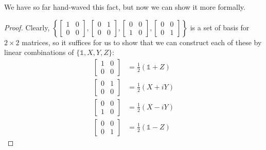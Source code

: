 \documentclass[12pt]{article}
\begin{document}
\begin{lemma}\label{lemma:pauli-is-basis}
We have so far hand-waved this fact, but now we can show it more formally.
\end{lemma}
\begin{proof}
Clearly, $\left\{\begin{bmatrix}
1 & 0\\
0 & 0
\end{bmatrix}, \begin{bmatrix}
0 & 1\\
0 & 0
\end{bmatrix}, \begin{bmatrix}
0 & 0\\
1 & 0
\end{bmatrix}, \begin{bmatrix}
0 & 0\\
0 & 1
\end{bmatrix}\right\}$ is a set of basis for $2\times 2$ matrices, so it suffices for us to show that we can construct each of these by linear combinations of $\{\mathbb{1}, X, Y, Z\}$: $$
\begin{aligned}
\begin{bmatrix}
1 & 0\\
0 & 0
\end{bmatrix}
    &= \frac{1}{2}(\mathbb{1} + Z)\\
\begin{bmatrix}
0 & 1\\
0 & 0
\end{bmatrix}
    &= \frac{1}{2}(X + iY)\\
\begin{bmatrix}
0 & 0\\
1 & 0
\end{bmatrix}
    &= \frac{1}{2}(X - iY)\\
\begin{bmatrix}
0 & 0\\
0 & 1
\end{bmatrix}
    &= \frac{1}{2}(\mathbb{1} - Z)
\end{aligned}
$$
\end{proof}
\end{document}
